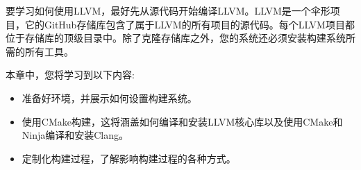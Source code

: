 
要学习如何使用LLVM，最好先从源代码开始编译LLVM。LLVM是一个伞形项目，它的GitHub存储库包含了属于LLVM的所有项目的源代码。每个LLVM项目都位于存储库的顶级目录中。除了克隆存储库之外，您的系统还必须安装构建系统所需的所有工具。\par

本章中，您将学习到以下内容:\par

\begin{itemize}
	\item 准备好环境，并展示如何设置构建系统。
	\item 使用CMake构建，这将涵盖如何编译和安装LLVM核心库以及使用CMake和Ninja编译和安装Clang。
	\item 定制化构建过程，了解影响构建过程的各种方式。
\end{itemize}


